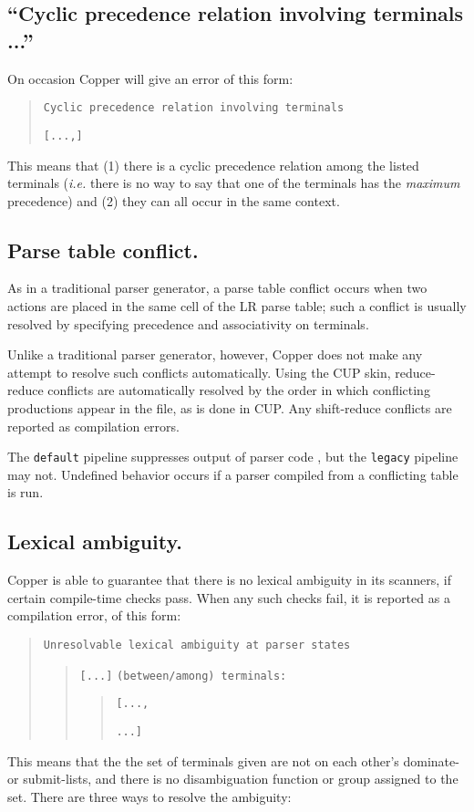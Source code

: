 \documentclass[12pt,english,twoside]{report}
\begin{document}
\subsection{\label{sub:Contradiction-involving-terminals}{}``Cyclic precedence relation involving terminals ...''}

On occasion Copper will give an error of this form:

\begin{quote}
\texttt{Cyclic precedence relation involving terminals}

\texttt{{[}...,{]}}
\end{quote}
This means that (1) there is a cyclic precedence relation among the
listed terminals (\emph{i.e.} there is no way to say that one of the
terminals has the \emph{maximum} precedence) and (2) they can all
occur in the same context.


\subsection{Parse table conflict.}

As in a traditional parser generator, a parse table conflict occurs
when two actions are placed in the same cell of the LR parse table;
such a conflict is usually resolved by specifying precedence and associativity
on terminals.

Unlike a traditional parser generator, however, Copper does not make
any attempt to resolve such conflicts automatically. Using the CUP
skin, reduce-reduce conflicts are automatically resolved by the order
in which conflicting productions appear in the file, as is done in
CUP. Any shift-reduce conflicts are reported as compilation errors.

The \texttt{default} pipeline suppresses output of parser code , but
the \texttt{legacy} pipeline may not. Undefined behavior occurs if a
parser compiled from a conflicting table is run.

\subsection{Lexical ambiguity.}

Copper is able to guarantee that there is no lexical ambiguity in
its scanners, if certain compile-time checks pass. When any such checks
fail, it is reported as a compilation error, of this form:

\begin{quote}
\texttt{Unresolvable lexical ambiguity at parser states}
\begin{quote}
\texttt{{[}...]}
\texttt{(between/among) terminals:}
\begin{quote}
\texttt{{[}...,}

\texttt{...]}
\end{quote}
\end{quote}
\end{quote}
This means that the the set of terminals given are not on each other's
dominate- or submit-lists, and there is no disambiguation function
or group assigned to the set. There are three ways to resolve the
ambiguity:
\end{document}
